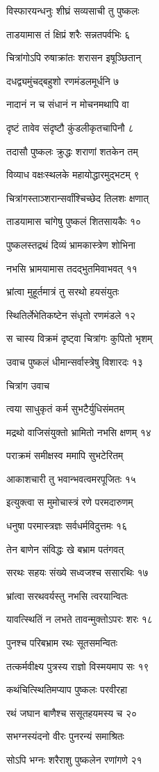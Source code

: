 विस्फारयन्धनुः शीघ्रं सव्यसाची तु पुष्कलः

ताडयामास तं क्षिप्रं शरैः सन्नतपर्वभिः ६

चित्रांगोऽपि रुषाक्रांतः शरासन इषूञ्छितान्

दधद्व्यमुंचद्बहुशो रणमंडलमूर्धनि ७

नादानं न च संधानं न मोचनमथापि वा

दृष्टं तावेव संदृष्टौ कुंडलीकृतचापिनौ ८

तदासौ पुष्कलः क्रुद्धः शराणां शतकेन तम्

विव्याध वक्षःस्थलके महायोद्धारमुद्भटम् ९

चित्रांगस्ताञ्शरान्सर्वांश्चिच्छेद तिलशः क्षणात्

ताडयामास चांगेषु पुष्कलं शितसायकैः १०

पुष्कलस्तद्रथं दिव्यं भ्रामकास्त्रेण शोभिना

नभसि भ्रामयामास तदद्भुतमिवाभवत् ११

भ्रांत्वा मुहूर्तमात्रं तु सरथो हयसंयुतः

स्थितिर्लेभेतिकष्टेन संधृतो रणमंडले १२

स चास्य विक्रमं दृष्ट्वा चित्रांगः कुपितो भृशम्

उवाच पुष्कलं धीमान्सर्वास्त्रेषु विशारदः १३

चित्रांग उवाच

त्वया साधुकृतं कर्म सुभटैर्युधिसंमतम्

मद्रथो वाजिसंयुक्तो भ्रामितो नभसि क्षणम् १४

पराक्रमं समीक्षस्व ममापि सुभटेरितम्

आकाशचारी तु भवान्भवत्वमरपूजितः १५

इत्युक्त्वा स मुमोचास्त्रं रणे परमदारुणम्

धनुषा परमास्त्रज्ञः सर्वधर्मविदुत्तमः १६

तेन बाणेन संविद्धः खे बभ्राम पतंगवत्

सरथः सहयः संख्ये सध्वजश्च ससारथिः १७

भ्रांत्वा सरथवर्यस्तु नभसि त्वरयान्वितः

यावत्स्थितिं न लभते तावन्मुक्तोऽपरः शरः १८

पुनश्च परिबभ्राम रथः सूतसमन्वितः

तत्कर्मवीक्ष्य पुत्रस्य राज्ञो विस्मयमाप सः १९

कथंचित्स्थितिमप्याप पुष्कलः परवीरहा

रथं जघान बाणैश्च ससूतहयमस्य च २०

सभग्नस्यंदनो वीरः पुनरन्यं समाश्रितः

सोऽपि भग्नः शरैराशु पुष्कलेन रणांगणे २१

